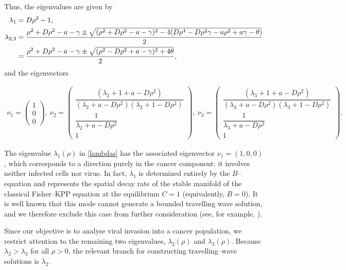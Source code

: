 \documentclass[11pt]{article}
\theoremstyle{definition}
\begin{document}
Thus, the eigenvalues are given by \begin{align}\label{lambdas}\notag \lambda_{1}&= D \rho^2-1, \\  \lambda_{2,3}&= \frac{\rho^2+D \rho^2-a- \gamma \pm \sqrt{(\rho^2+ D \rho^2-a- \gamma)^2- 4(D \rho^4- D \rho^2 \gamma- a \rho^2+ a \gamma- \theta)}}{2}\\ \notag &= \frac{\rho^2+D \rho^2-a- \gamma \pm \sqrt{(\rho^2- D \rho^2+a- \gamma)^2+ 4 \theta}}{2},
\end{align} and the eigenvectors 


\begin{align}\label{nu_s}
    \nu_1= \begin{pmatrix}
        1\\0\\0
    \end{pmatrix}, \ \nu_2= \begin{pmatrix}
       \dfrac{(\lambda_2+1+a-D \rho^2)}{(\lambda_2+a-D \rho^2 )(\lambda_2+1-D\rho^2 )} \\ \dfrac{1}{\lambda_2+a-D \rho^2} \\ 1
    \end{pmatrix}, \ \nu_3= \begin{pmatrix}
       \dfrac{(\lambda_3+1+a-D \rho^2)}{(\lambda_3+a-D \rho^2 )(\lambda_3+1-D\rho^2 )} \\ \dfrac{1}{\lambda_3+a-D \rho^2} \\ 1
    \end{pmatrix}.
\end{align}

The eigenvalue $\lambda_{1}(\rho)$ in \eqref{lambdas} has the associated eigenvector 
$\nu_{1} = (1,0,0)$, which corresponds to a direction purely in the cancer component: it involves neither infected cells nor virus. In fact, $\lambda_{1}$ is determined entirely by the $B$–equation and represents the spatial decay rate of the stable manifold of the classical Fisher--KPP equation at the equilibrium $C=1$ (equivalently, $B=0$). It is well known that this mode cannot generate a bounded travelling wave solution, and we therefore exclude this case from further consideration (see, for example, \cite{Britton, murray}).

Since our objective is to analyse viral invasion into a cancer population, we restrict attention to the remaining two eigenvalues, $\lambda_{2}(\rho)$ and $\lambda_{3}(\rho)$. Because $\lambda_{2} > \lambda_{3}$ for all $\rho>0$, the relevant branch for constructing travelling–wave solutions is $\lambda_{2}$.
\end{document}
